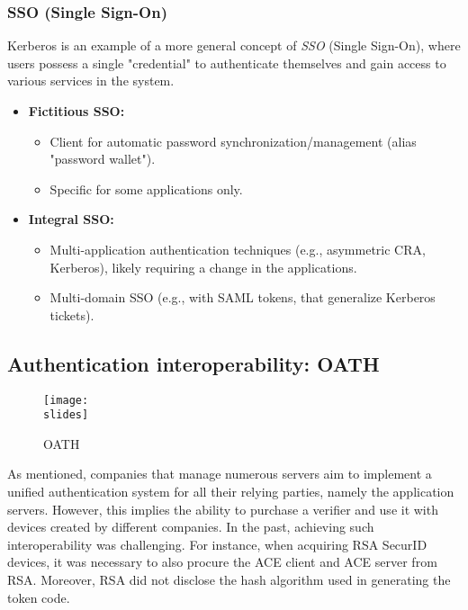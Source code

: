 \subsubsection{SSO (Single Sign-On)}

Kerberos is an example of a more general concept of \textit{SSO} (Single Sign-On), where users possess a single "credential" to authenticate themselves and gain access to various services in the system.

\begin{itemize}
  \item \textbf{Fictitious SSO:}
        \begin{itemize}
          \item Client for automatic password synchronization/management (alias "password wallet").
          \item Specific for some applications only.
        \end{itemize}

  \item \textbf{Integral SSO:}
        \begin{itemize}
          \item Multi-application authentication techniques (e.g., asymmetric CRA, Kerberos), likely requiring a change in the applications.
          \item Multi-domain SSO (e.g., with SAML tokens, that generalize Kerberos tickets).
        \end{itemize}
\end{itemize}



\subsection{Authentication interoperability: OATH}

\begin{figure}[h]
  \centering
  \texttt{[image: \\slides]}
  \caption{OATH}
\end{figure}

As mentioned, companies that manage numerous servers aim to implement a unified authentication system for all their relying parties, namely the application servers. However, this implies the ability to purchase a verifier and use it with devices created by different companies. In the past, achieving such interoperability was challenging. For instance, when acquiring RSA SecurID devices, it was necessary to also procure the ACE client and ACE server from RSA. Moreover, RSA did not disclose the hash algorithm used in generating the token code.

